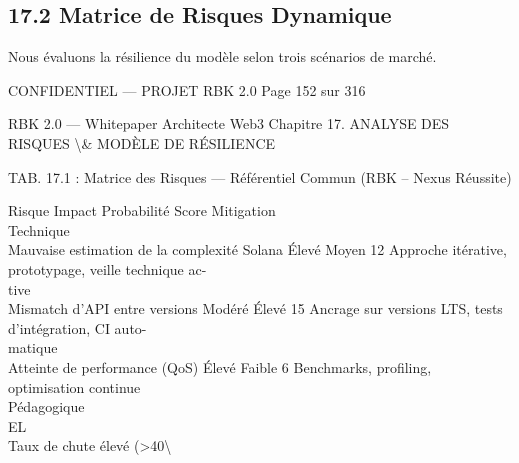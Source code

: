 \subsection{17.2 Matrice de Risques Dynamique}
Nous évaluons la résilience du modèle selon trois scénarios de marché.\\
\vspace{0.5em}
\vspace{0.5em}
\vspace{0.5em}
\vspace{0.5em}
\begin{confidential}CONFIDENTIEL — PROJET RBK 2.0                               Page 152 sur 316\end{confidential}
RBK 2.0 — Whitepaper Architecte Web3                                        Chapitre 17. ANALYSE DES RISQUES \textbackslash{}& MODÈLE DE RÉSILIENCE\\
\vspace{0.5em}
\vspace{0.5em}
\begin{center}\begin{tabular}TAB. 17.1 : Matrice des Risques — Référentiel Commun (RBK – Nexus Réussite)\end{tabular}\end{center}
\vspace{0.5em}
\vspace{0.5em}
Risque                                               Impact Probabilité Score Mitigation\\
Technique\\
Mauvaise estimation de la complexité Solana           Élevé     Moyen         12   Approche itérative, prototypage, veille technique ac-\\
tive\\
Mismatch d’API entre versions                        Modéré      Élevé        15   Ancrage sur versions LTS, tests d’intégration, CI auto-\\
matique\\
Atteinte de performance (QoS)                         Élevé     Faible        6    Benchmarks, profiling, optimisation continue\\
Pédagogique\\
\vspace{0.5em}
\vspace{0.5em}
\vspace{0.5em}
\vspace{0.5em}
EL\\
Taux de chute élevé (\textgreater{}40\textbackslash{}%
